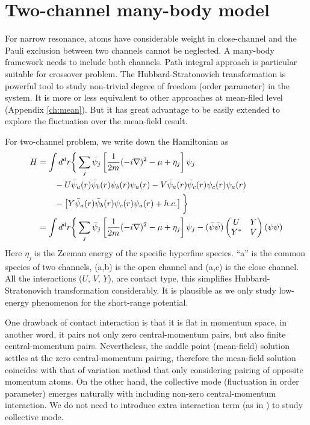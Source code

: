 
\chapter{Two-channel many-body model\label{ch:path2}}
For narrow resonance, atoms have considerable weight in close-channel and the Pauli exclusion between two channels cannot be neglected.  A many-body framework needs to include both channels.  Path integral approach is particular suitable for crossover problem.   The Hubbard-Stratonovich transformation is powerful tool to study non-trivial degree of freedom (order parameter) in the system.  It is more or less equivalent to other approaches at mean-filed level (Appendix \ref{ch:mean}). But it has great advantage to be easily extended to explore the fluctuation over the mean-field result.  

For two-channel problem, we write down the Hamiltonian as
\begin{equation}\label{eq:pathInt2:ham2}
\begin{split}
H&=\int{d^{d}r}\bigg\{\sum_{j}\bar\psi_{j}\left[\frac{1}{2m}(-i\nabla)^{2}-\mu+\eta_{j}\right]\psi_{j}\\
	&\qquad-U\bar\psi_{a}(r)\bar\psi_{b}(r)\psi_{b}(r)\psi_{a}(r)-V\bar\psi_{a}(r)\bar\psi_{c}(r)\psi_{c}(r)\psi_{a}(r)\\
	&\qquad-\left[Y\bar\psi_{a}(r)\bar\psi_{b}(r)\psi_{c}(r)\psi_{a}(r)+h.c.\right]
	\bigg\}\\
 &=\int{d^{d}r}\bigg\{\sum_{j}\bar\psi_{j}\left[\frac{1}{2m}(-i\nabla)^{2}-\mu+\eta_{j}\right]\psi_{j}
 	-(\bar\psi\bar\psi)\begin{pmatrix}U&Y\\Y^{*}&V\end{pmatrix}(\psi\psi)
\end{split}
\end{equation}
Here $\eta_{j}$ is the Zeeman energy of the specific hyperfine species.  ``a'' is the common species of two channels, (a,b) is the open channel and (a,c) is the close channel.  All the interactions ($U$, $V$, $Y$), are contact type, this simplifies Hubbard-Stratonovich transformation considerably.  It is plausible as we only study low-energy phenomenon for the short-range potential. 

One drawback of contact interaction is that it is flat in momentum space, in another word, it pairs not only zero central-momentum pairs, but also finite central-momentum pairs.  Nevertheless, the saddle point (mean-field) solution settles at the zero central-momentum pairing, therefore the mean-field solution coincides with that of  variation method that only considering pairing of opposite momentum atoms.  On the other hand, the collective mode (fluctuation in order parameter) emerges naturally with including non-zero central-momentum interaction.  We do not need to introduce extra interaction term (as in \cite{AndersonBCS}) to study collective mode.   

